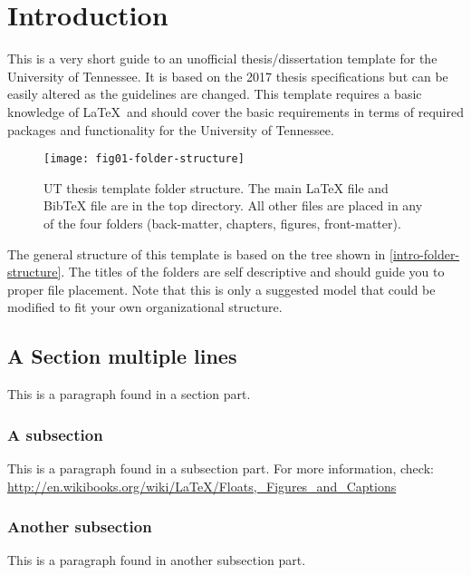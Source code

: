 \chapter{Introduction} \label{chapter1}

\tab This is a very short guide to an unofficial thesis/dissertation template
for the University of Tennessee.
It is based on the 2017 thesis specifications but can be easily altered
as the guidelines are changed.
This template requires a basic knowledge of \LaTeX\ and should cover
the basic requirements in terms of required packages and functionality
for the University of Tennessee.

\begin{figure}[!b]
  \Centering
  \texttt{[image: fig01-folder-structure]}
  \caption[UT thesis template folder structure]{UT thesis template folder structure. The main LaTeX file and
           BibTeX file are in the top directory. All other files are placed
           in any of the four folders
           (back-matter, chapters, figures, front-matter).}
  \label{intro-folder-structure}
\end{figure}

\tab The general structure of this template is based on the tree shown in
\autoref{intro-folder-structure}.
The titles of the folders are self descriptive and should guide you to proper file placement.
Note that this is only a suggested model that could be
modified to fit your own organizational structure.

\section{A Section multiple lines} \label{asection}
This is a paragraph found in a section part.

\subsection{A subsection}
This is a paragraph found in a subsection part.
For more information, check: \url{http://en.wikibooks.org/wiki/LaTeX/Floats,_Figures_and_Captions}

\subsection{Another subsection}
This is a paragraph found in another subsection part.

